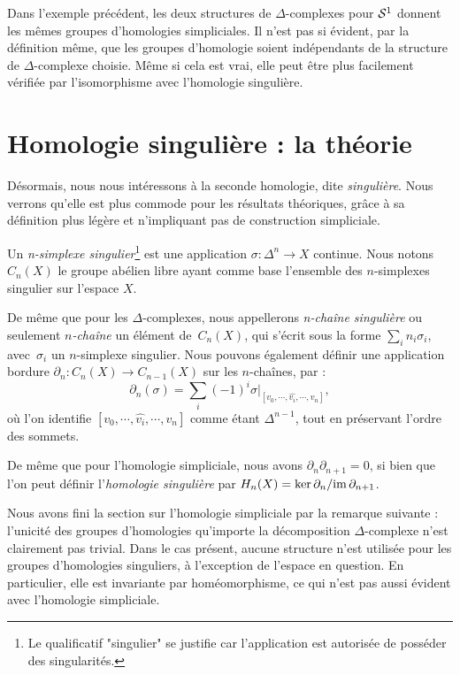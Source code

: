 \begin{remark}
Dans l'exemple précédent, les deux structures de $\Delta$-complexes pour $\mathcal{S}^{1}$ donnent les mêmes groupes d'homologies simpliciales. Il n'est pas si évident, par la définition même, que les groupes d'homologie soient indépendants de la structure de $\Delta$-complexe choisie. Même si cela est vrai, elle peut être plus facilement vérifiée par l'isomorphisme avec l'homologie singulière.
\end{remark}

\section{Homologie singulière : la théorie}\label{sect:singular-homology}

Désormais, nous nous intéressons à la seconde homologie, dite \emph{singulière}. Nous verrons qu'elle est plus commode pour les résultats théoriques, grâce à sa définition plus légère et n'impliquant pas de construction simpliciale.

\begin{definition}\label{def:homology-sing}
Un \emph{n-simplexe singulier}\footnote{Le qualificatif "singulier" se justifie car l'application est autorisée de posséder des singularités.} est une application $\sigma:\Delta^n\to X$ continue. Nous notons~$C_n(X)$ le groupe abélien libre ayant comme base l'ensemble des $n$-simplexes singulier sur l'espace $X$. 

De même que pour les $\Delta$-complexes, nous appellerons \emph{n-chaîne singulière} ou seulement \emph{$n$-chaîne} un élément de~$C_n(X)$, qui s'écrit sous la forme $\sum_in_i\sigma_i$, avec~$\sigma_i$ un $n$-simplexe singulier. Nous pouvons également définir une application bordure $\partial_n:C_n(X)\to C_{n-1}(X)$ sur les $n$-chaînes, par : \[\partial_n(\sigma)=\sum_i(-1)^i\sigma|_{[v_0,\cdots,\hat{v_i},\cdots,v_n]},\] où l'on identifie  $[v_0,\cdots,\hat{v_i},\cdots,v_n]$ comme étant $\Delta^{n-1}$, tout en préservant l'ordre des sommets.

De même que pour l'homologie simpliciale, nous avons $\partial_n\partial_{n+1}=0$, si bien que l'on peut définir l'\emph{homologie singulière} par $H_n(X)=\ker\partial_n/\mathrm{im}\,\partial_{n+1}$.
\end{definition}

Nous avons fini la section sur l'homologie simpliciale par la remarque suivante : l'unicité des groupes d'homologies qu'importe la décomposition $\Delta$-complexe n'est clairement pas trivial. Dans le cas présent, aucune structure n'est utilisée pour les groupes d'homologies singuliers, à l'exception de l'espace en question. En particulier, elle est invariante par homéomorphisme, ce qui n'est pas aussi évident avec l'homologie simpliciale.

